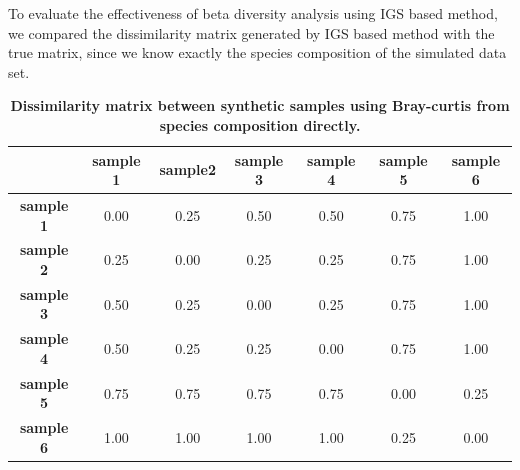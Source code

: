 To evaluate the effectiveness of beta diversity analysis using IGS based method, 
we compared the dissimilarity matrix generated by IGS based method with the 
true matrix, since we know exactly the species composition of the 
simulated data set.


\begin{table}[!ht]
\begin{tabular}{|c|c|c|c|c|c|c|}
\hline
                  & \textbf{sample 1} & \textbf{sample2} & \textbf{sample 3} & \textbf{sample 4} & \textbf{sample 5} & \textbf{sample 6} \\ \hline
\textbf{sample 1} & 0.00              & 0.25             & 0.50              & 0.50              & 0.75              & 1.00              \\ \hline
\textbf{sample 2} & 0.25              & 0.00             & 0.25              & 0.25              & 0.75              & 1.00              \\ \hline
\textbf{sample 3} & 0.50              & 0.25             & 0.00              & 0.25              & 0.75              & 1.00              \\ \hline
\textbf{sample 4} & 0.50              & 0.25             & 0.25              & 0.00              & 0.75              & 1.00              \\ \hline
\textbf{sample 5} & 0.75              & 0.75             & 0.75              & 0.75              & 0.00              & 0.25              \\ \hline
\textbf{sample 6} & 1.00              & 1.00             & 1.00              & 1.00              & 0.25              & 0.00              \\ \hline
\end{tabular}
\caption{\bf Dissimilarity matrix between synthetic samples using Bray-curtis
from species composition directly. }
\label{table:simulated_real_matrix}
\end{table}

